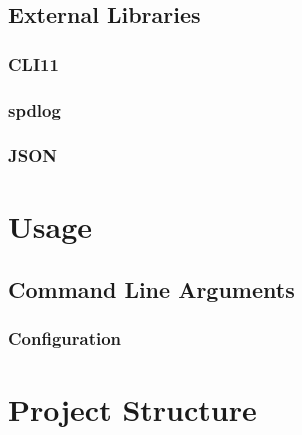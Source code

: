\documentclass[12pt, letterpaper]{article}
\begin{document}
\subsection{External Libraries}
\label{extBib}

\subsubsection{CLI11}


\subsubsection{spdlog}


\subsubsection{JSON}


\section{Usage}
\label{usage}

\subsection{Command Line Arguments}

\subsubsection{Configuration}


\newpage

\section{Project Structure}


\newpage


\end{document}

